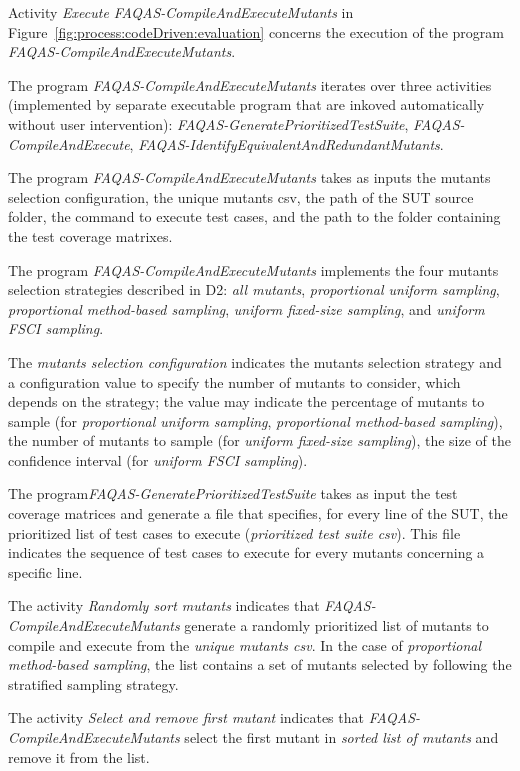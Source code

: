 \RQ{} Activity \emph{Execute FAQAS-CompileAndExecuteMutants} in Figure~\ref{fig:process:codeDriven:evaluation} concerns the execution of the program \emph{FAQAS-CompileAndExecuteMutants}.

\RQ{} The program \emph{FAQAS-CompileAndExecuteMutants} iterates over three activities (implemented by separate executable program that are inkoved automatically without user intervention): \emph{FAQAS-GeneratePrioritizedTestSuite}, \emph{FAQAS-CompileAndExecute}, \emph{FAQAS-IdentifyEquivalentAndRedundantMutants}.

\RQ{} The program \emph{FAQAS-CompileAndExecuteMutants} takes as inputs the mutants selection configuration, the unique mutants csv, the path of the SUT source folder, the command to execute test cases, and the path to the folder containing the test coverage matrixes.

\RQ{} The program \emph{FAQAS-CompileAndExecuteMutants} implements the four mutants selection strategies described in D2: \emph{all mutants}, \emph{proportional uniform sampling}, \emph{proportional method-based sampling}, \emph{uniform fixed-size sampling}, and \emph{uniform FSCI sampling}.

\RQ{} The \emph{mutants selection configuration} indicates the mutants selection strategy and a configuration value to specify the number of mutants to consider, which depends on the strategy; the value may indicate the percentage of mutants to sample (for \emph{proportional uniform sampling}, \emph{proportional method-based sampling}), the number of mutants to sample (for \emph{uniform fixed-size sampling}), the size of the confidence interval (for \emph{uniform FSCI sampling}).

\RQ{} The program\emph{FAQAS-GeneratePrioritizedTestSuite} takes as input the test coverage matrices and generate a file that specifies, for every line of the SUT, the prioritized list of test cases to execute (\emph{prioritized test suite csv}). This file indicates the sequence of test cases to execute for every mutants concerning a specific line.

\RQ{} The activity \emph{Randomly sort mutants} indicates that  \emph{FAQAS-CompileAndExecuteMutants} generate a randomly prioritized list of mutants to compile and execute from the \emph{unique mutants csv}.
In the case of \emph{proportional method-based sampling}, the list contains a set of mutants selected by following the stratified sampling strategy.

\RQ{} The activity \emph{Select and remove first mutant} indicates that  \emph{FAQAS-CompileAndExecuteMutants} select the first mutant in \emph{sorted list of mutants} and remove it from the list.

